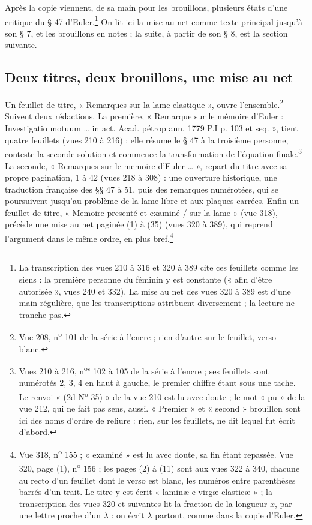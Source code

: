 \documentclass[11pt,a4paper]{article}
\begin{document}
Après la copie viennent, de sa main pour les brouillons, plusieurs états d'une critique du § 47 d'Euler.\footnote{La transcription des vues 210 à 316 et 320 à 389 cite ces feuillets comme les siens : la première personne du féminin y est constante (« afin d'être autorisée », vues 240 et 332). La mise au net des vues 320 à 389 est d'une main régulière, que les transcriptions attribuent diversement ; la lecture ne tranche pas.} On lit ici la mise au net comme texte principal jusqu'à son § 7, et les brouillons en notes ; la suite, à partir de son § 8, est la section suivante.

\subsection*{Deux titres, deux brouillons, une mise au net}

Un feuillet de titre, « Remarques sur la lame elastique », ouvre l'ensemble.\footnote{Vue 208, n\textsuperscript{o} 101 de la série à l'encre ; rien d'autre sur le feuillet, verso blanc.} Suivent deux rédactions. La première, « Remarque sur le mémoire d'Euler : Investigatio motuum … in act. Acad. pétrop ann. 1779 P.I p. 103 et seq. », tient quatre feuillets (vues 210 à 216) : elle résume le § 47 à la troisième personne, conteste la seconde solution et commence la transformation de l'équation finale.\footnote{Vues 210 à 216, n\textsuperscript{os} 102 à 105 de la série à l'encre ; ses feuillets sont numérotés 2, 3, 4 en haut à gauche, le premier chiffre étant sous une tache. Le renvoi « (2d N\textsuperscript{o} 35) » de la vue 210 est lu avec doute ; le mot « pu » de la vue 212, qui ne fait pas sens, aussi. « Premier » et « second » brouillon sont ici des noms d'ordre de reliure : rien, sur les feuillets, ne dit lequel fut écrit d'abord.} La seconde, « Remarques sur le memoire d'Euler … », repart du titre avec sa propre pagination, 1 à 42 (vues 218 à 308) : une ouverture historique, une traduction française des §§ 47 à 51, puis des remarques numérotées, qui se poursuivent jusqu'au problème de la lame libre et aux plaques carrées. Enfin un feuillet de titre, « Memoire presenté et examiné / sur la lame » (vue 318), précède une mise au net paginée (1) à (35) (vues 320 à 389), qui reprend l'argument dans le même ordre, en plus bref.\footnote{Vue 318, n\textsuperscript{o} 155 ; « examiné » est lu avec doute, sa fin étant repassée. Vue 320, page (1), n\textsuperscript{o} 156 ; les pages (2) à (11) sont aux vues 322 à 340, chacune au recto d'un feuillet dont le verso est blanc, les numéros entre parenthèses barrés d'un trait. Le titre y est écrit « laminæ e virgæ elasticæ » ; la transcription des vues 320 et suivantes lit la fraction de la longueur $x$, par une lettre proche d'un $\lambda$ : on écrit $\lambda$ partout, comme dans la copie d'Euler.}
\end{document}
